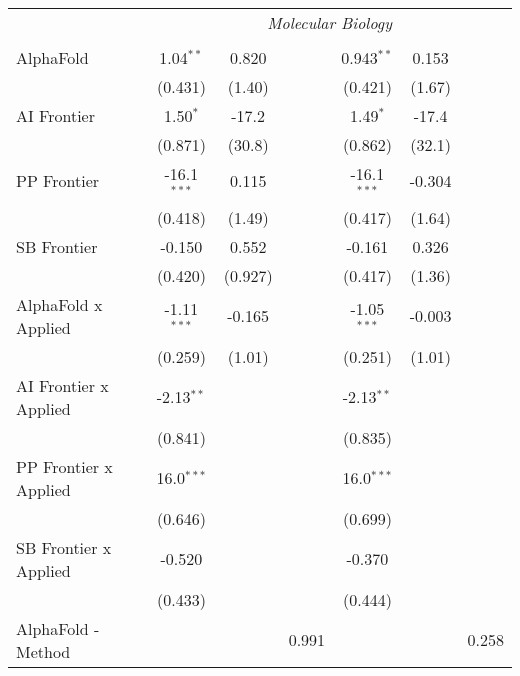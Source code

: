 \begin{tabular}{lcccccc}
 & \multicolumn{6}{c}{\textit{Molecular Biology}} \\ \\
   AlphaFold                    & 1.04$^{**}$   & 0.820   &               & 0.943$^{**}$  & 0.153  &   \\   
                                & (0.431)       & (1.40)  &               & (0.421)       & (1.67) &   \\   
   AI Frontier                  & 1.50$^{*}$    & -17.2   &               & 1.49$^{*}$    & -17.4  &   \\   
                                & (0.871)       & (30.8)  &               & (0.862)       & (32.1) &   \\   
   PP Frontier                  & -16.1$^{***}$ & 0.115   &               & -16.1$^{***}$ & -0.304 &   \\   
                                & (0.418)       & (1.49)  &               & (0.417)       & (1.64) &   \\   
   SB Frontier                  & -0.150        & 0.552   &               & -0.161        & 0.326  &   \\   
                                & (0.420)       & (0.927) &               & (0.417)       & (1.36) &   \\   
   AlphaFold x Applied          & -1.11$^{***}$ & -0.165  &               & -1.05$^{***}$ & -0.003 &   \\   
                                & (0.259)       & (1.01)  &               & (0.251)       & (1.01) &   \\   
   AI Frontier x Applied        & -2.13$^{**}$  &         &               & -2.13$^{**}$  &        &   \\   
                                & (0.841)       &         &               & (0.835)       &        &   \\   
   PP Frontier x Applied        & 16.0$^{***}$  &         &               & 16.0$^{***}$  &        &   \\   
                                & (0.646)       &         &               & (0.699)       &        &   \\   
   SB Frontier x Applied        & -0.520        &         &               & -0.370        &        &   \\   
                                & (0.433)       &         &               & (0.444)       &        &   \\   
   AlphaFold - Method           &               &         & 0.991         &               &        & 0.258\\   

\end{tabular}
